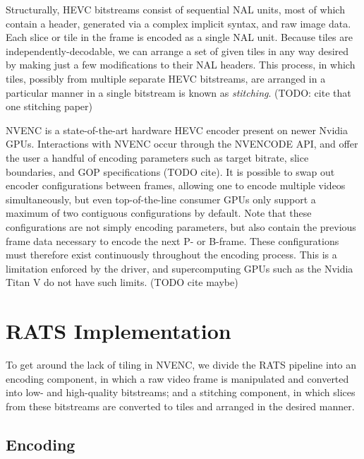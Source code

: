 Structurally, HEVC bitstreams consist of sequential NAL units, most of which contain a header, generated via a complex implicit syntax, and raw image data. Each slice or tile in the frame is encoded as a single NAL unit. Because tiles are independently-decodable, we can arrange a set of given tiles in any way desired by making just a few modifications to their NAL headers. This process, in which tiles, possibly from multiple separate HEVC bitstreams, are arranged in a particular manner in a single bitstream is known as \textit{stitching}. (TODO: cite that one stitching paper)

NVENC is a state-of-the-art hardware HEVC encoder present on newer Nvidia GPUs. Interactions with NVENC occur through the NVENCODE API, and offer the user a handful of encoding parameters such as target bitrate, slice boundaries, and GOP specifications (TODO cite). It is possible to swap out encoder configurations between frames, allowing one to encode multiple videos simultaneously, but even top-of-the-line consumer GPUs only support a maximum of two contiguous configurations by default. Note that these configurations are not simply encoding parameters, but also contain the previous frame data necessary to encode the next P- or B-frame. These configurations must therefore exist continuously throughout the encoding process. This is a limitation enforced by the driver, and supercomputing GPUs such as the Nvidia Titan V do not have such limits. (TODO cite maybe)

\section{RATS Implementation} \label{rats}
To get around the lack of tiling in NVENC, we divide the RATS pipeline into an encoding component, in which a raw video frame is manipulated and converted into low- and high-quality bitstreams; and a stitching component, in which slices from these bitstreams are converted to tiles and arranged in the desired manner.

\subsection{Encoding}

